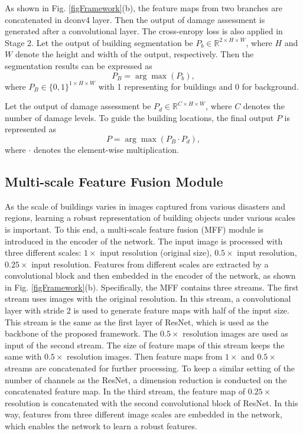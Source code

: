 \documentclass[journal]{IEEEtran}
\begin{document}
As shown in Fig. \ref{figFramework}(b), the feature maps from two branches are concatenated in dconv4 layer. Then the output of damage assessment is generated after a convolutional layer. The cross-enropy loss is also applied in Stage 2.
Let the output of building segmentation be $P_b\in \mathbb{R}^{2\times H\times W}$, where $H$ and $W$ denote the height and width of the output, respectively.
Then the segmentation results can be expressed as
\begin{equation}
P_B = \arg\max (P_b),
\label{eqPB}
\end{equation}
where $P_B \in \{0,1\}^{1\times H\times W}$ with 1 representing for buildings and 0 for background.

Let the output of damage assessment be $P_d \in \mathbb{R}^{C\times H\times W}$, where $C$ denotes the number of damage levels. To guide the building locations, the final output $P$ is represented as
\begin{equation}
P = \arg\max (P_B \cdot P_d),
\label{eqOutput}
\end{equation}
where $\cdot$ denotes the element-wise multiplication. 

\subsection{Multi-scale Feature Fusion Module}
As the scale of buildings varies in images captured from various disasters and regions, learning a robust representation of building objects under various scales is important. To this end, a multi-scale feature fusion (MFF) module is introduced in the encoder of the network. The input image is processed with three different scales:  $1\times$ input resolution (original size), $0.5\times$ input resolution, $0.25\times$ input resolution. Features from different scales are extracted by a convolutional block and then embedded in the encoder of the network, as shown in Fig. \ref{figFramework}(b). Specifically, the MFF contains three streams. The first stream uses images with the original resolution. In this stream, a convolutional layer with stride 2 is used to generate feature maps with half of the input size. This stream is the same as the first layer of ResNet, which is used as the backbone of the proposed framework.
The $0.5\times$  resolution images are used as input of the second stream. The size of feature maps of this stream keeps the same with $0.5\times$ resolution images. Then feature maps from $1\times$ and $0.5\times$ streams are concatenated for further processing. To keep a similar setting of the number of channels as the ResNet, a dimension reduction is conducted on the concatenated feature map. In the third stream, the feature map of $0.25\times$ resolution is concatenated with the second convolutional block of ResNet. In this way, features from three different image scales are embedded in the network, which enables the network to learn a robust features.
\end{document}
